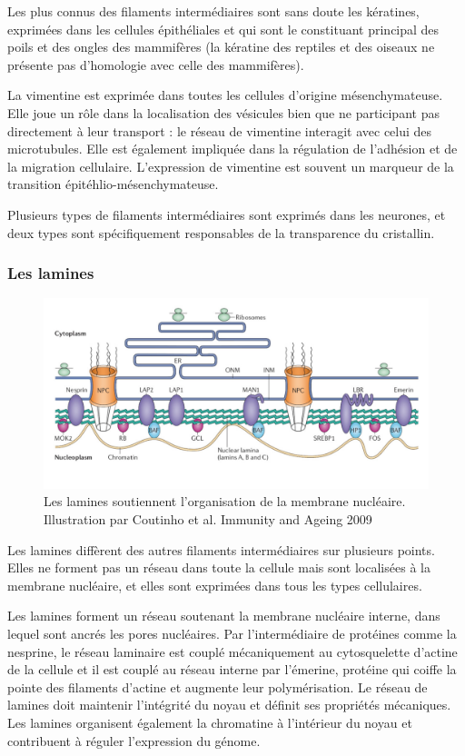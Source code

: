 Les plus connus des filaments intermédiaires sont sans doute les kératines, exprimées dans les cellules épithéliales et qui sont le constituant principal des poils et des ongles des mammifères (la kératine des reptiles et des oiseaux ne présente pas d'homologie avec celle des mammifères). 

La vimentine est exprimée dans toutes les cellules d'origine mésenchymateuse. Elle joue un rôle dans la localisation des vésicules bien que ne participant pas directement à leur transport : le réseau de vimentine interagit avec celui des microtubules. Elle est également impliquée dans la régulation de l'adhésion et de la migration cellulaire. 
L'expression de vimentine est souvent un marqueur de la transition épitéhlio-mésenchymateuse. 

Plusieurs types de filaments intermédiaires sont exprimés dans les neurones, et deux types sont spécifiquement responsables de la transparence du cristallin. 

\subsubsection{Les lamines}
\begin{figure}
\includegraphics[scale=1.5]{Structure_and_function_of_the_nuclear_lamina.jpg}
\caption{Les lamines soutiennent l'organisation de la membrane nucléaire. Illustration par  Coutinho et al. Immunity and Ageing 2009}
\end{figure}
Les lamines diffèrent des autres filaments intermédiaires sur plusieurs points. Elles ne forment pas un réseau dans toute la cellule mais sont localisées à la membrane nucléaire, et elles sont exprimées dans tous les types cellulaires. 

Les lamines forment un réseau soutenant la membrane nucléaire interne, dans lequel sont ancrés les pores nucléaires. Par l'intermédiaire de protéines comme la nesprine, le réseau laminaire est couplé mécaniquement au cytosquelette d'actine de la cellule et il est couplé au réseau interne par l'émerine, protéine qui coiffe la pointe des filaments d'actine et augmente leur polymérisation. 
Le réseau de lamines doit maintenir l'intégrité du noyau et définit ses propriétés mécaniques. 
Les lamines organisent également la chromatine à l'intérieur du noyau et contribuent à réguler l'expression du génome. 

